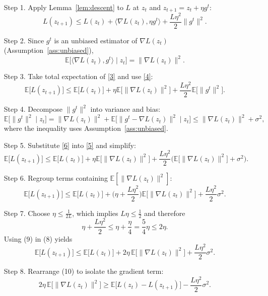 \documentclass{article}
\newcommand{\E}{\mathbb{E}}
\begin{document}
\begin{enumerate}
\item[Step 1.] Apply Lemma~\ref{lem:descent} to $L$ at $z_{t}$ and $z_{t+1}=z_{t}+\eta g^{t}$:
\[
L(z_{t+1})\le L(z_{t})+\langle\nabla L(z_{t}),\eta g^{t}\rangle+\frac{L\eta^{2}}{2}\|g^{t}\|^{2}.
\tag{3}
\]

\item[Step 2.] Since $g^{t}$ is an unbiased estimator of $\nabla L(z_{t})$ (Assumption~\ref{ass:unbiased}),
\[
\E\big[\langle\nabla L(z_{t}),g^{t}\rangle\mid z_{t}\big]
= \|\nabla L(z_{t})\|^{2}.
\tag{4}
\]

\item[Step 3.] Take total expectation of \eqref{3} and use \eqref{4}:
\[
\E\big[L(z_{t+1})\big]\le \E\big[L(z_{t})\big]+\eta\E\big[\|\nabla L(z_{t})\|^{2}\big]
+\frac{L\eta^{2}}{2}\E\big[\|g^{t}\|^{2}\big].
\tag{5}
\]

\item[Step 4.] Decompose $\|g^{t}\|^{2}$ into variance and bias:
\[
\E\big[\|g^{t}\|^{2}\mid z_{t}\big]
= \|\nabla L(z_{t})\|^{2}+\E\big[\|g^{t}-\nabla L(z_{t})\|^{2}\mid z_{t}\big]
\le \|\nabla L(z_{t})\|^{2}+\sigma^{2},
\tag{6}
\]
where the inequality uses Assumption~\ref{ass:unbiased}.

\item[Step 5.] Substitute \eqref{6} into \eqref{5} and simplify:
\[
\E\big[L(z_{t+1})\big]\le \E\big[L(z_{t})\big]
+\eta\E\big[\|\nabla L(z_{t})\|^{2}\big]
+\frac{L\eta^{2}}{2}\Big(\E\big[\|\nabla L(z_{t})\|^{2}\big]+\sigma^{2}\Big).
\tag{7}
\]

\item[Step 6.] Regroup terms containing $\E[\|\nabla L(z_{t})\|^{2}]$:
\[
\E\big[L(z_{t+1})\big]\le \E\big[L(z_{t})\big]
+\Big(\eta+\frac{L\eta^{2}}{2}\Big)\E\big[\|\nabla L(z_{t})\|^{2}\big]
+\frac{L\eta^{2}}{2}\sigma^{2}.
\tag{8}
\]

\item[Step 7.] Choose $\eta\le\frac{1}{2L}$, which implies $L\eta\le\frac12$ and therefore
\[
\eta+\frac{L\eta^{2}}{2}\le \eta+\frac{\eta}{4}= \frac{5}{4}\eta
\le 2\eta.
\tag{9}
\]
Using (9) in (8) yields
\[
\E\big[L(z_{t+1})\big]\le \E\big[L(z_{t})\big]
+2\eta\,\E\big[\|\nabla L(z_{t})\|^{2}\big]
+\frac{L\eta^{2}}{2}\sigma^{2}.
\tag{10}
\]

\item[Step 8.] Rearrange (10) to isolate the gradient term:
\[
2\eta\,\E\big[\|\nabla L(z_{t})\|^{2}\big]
\ge \E\big[L(z_{t})-L(z_{t+1})\big]-\frac{L\eta^{2}}{2}\sigma^{2}.
\tag{11}
\]


\end{enumerate}
\end{document}
